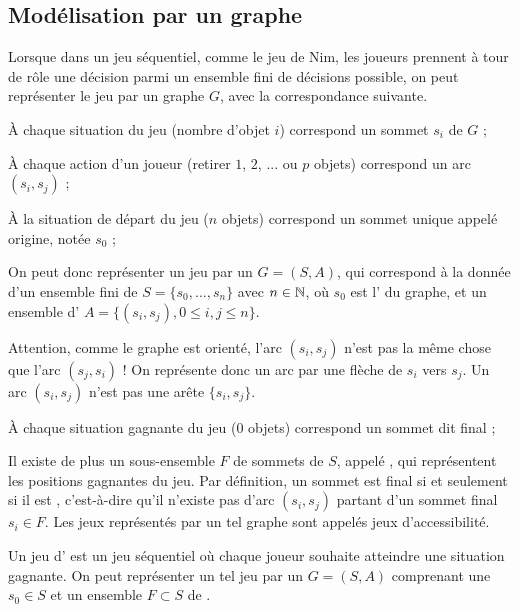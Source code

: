 \documentclass[12pt,fancy]{cours}
\begin{document}
\subsection{Modélisation par un graphe}


Lorsque dans un jeu séquentiel, comme le jeu de Nim, les joueurs prennent à tour de rôle une décision parmi un ensemble fini de décisions possible, on peut représenter le jeu par un graphe $G$, avec la correspondance suivante.
\begin{liste}
  \item À chaque situation du jeu (nombre d'objet $i$) correspond un sommet $s_i$ de $G$ ;
  \item À chaque action d'un joueur (retirer $1$, $2$, ... ou $p$ objets) correspond un arc $(s_i,s_j)$ ;
  \item À la situation de départ du jeu ($n$ objets) correspond un sommet unique appelé origine, notée  $s_0$ ;
\end{liste}
\noindent
On peut donc représenter un jeu par un  $G=(S,A)$, qui correspond à la donnée d'un ensemble fini de  $S=\{s_0,...,s_{n}\}$ avec $n\in \mathbb{N}$, où $s_0$ est l' du graphe, et un ensemble d' $A=\{(s_i,s_j), 0\leq i,j\leq n\}$.

\begin{remarque}
  Attention, comme le graphe est orienté, l'arc $(s_i,s_j)$ n'est pas la même chose que l'arc $(s_j,s_i)$ ! On représente donc un arc par une flèche de $s_i$ vers $s_j$. Un arc $(s_i,s_j)$ n'est pas une arête $\{s_i,s_j\}$.
\end{remarque}
\begin{liste}
\item À chaque situation gagnante du jeu ($0$ objets) correspond un sommet dit final ;
\end{liste}
Il existe de plus un sous-ensemble $F$ de sommets de $S$, appelé , qui représentent les positions gagnantes du jeu. Par définition, un sommet est final si et seulement si il est , c'est-à-dire qu'il n'existe pas d'arc $(s_i,s_j)$ partant d'un sommet final $s_i \in F$. Les jeux représentés par un tel graphe sont appelés jeux d'accessibilité.
\begin{definition}
Un jeu d' est un jeu séquentiel où chaque joueur souhaite atteindre une situation gagnante. On peut représenter un tel jeu par un  $G=(S,A)$ comprenant une  $s_0 \in S$ et un ensemble $F \subset S$ de .
\end{definition}
\end{document}
